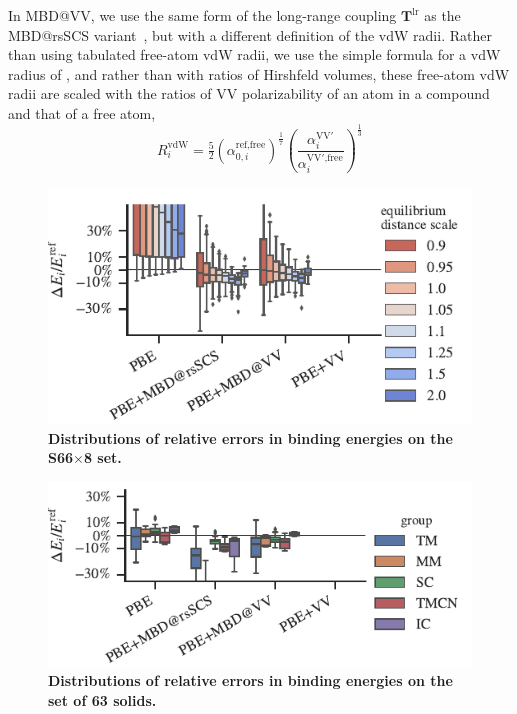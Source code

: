 In MBD@VV, we use the same form of the long-range coupling $\mathbf T^\text{lr}$ as the MBD@rsSCS variant~\citep{AmbrosettiJCP14}, but with a different definition of the vdW radii.
Rather than using tabulated free-atom vdW radii, we use the simple formula for a vdW radius of \citet{FedorovPRL18}, and rather than with ratios of Hirshfeld volumes, these free-atom vdW radii are scaled with the ratios of VV polarizability of an atom in a compound and that of a free atom,\begin{equation}
  R_i^\text{vdW}=\tfrac52{(\alpha_{0,i}^\text{ref,free})}^\frac17{\left(\frac{\alpha_i^\mathrm{VV'}}{\alpha_i^\text{VV$'$,free}}\right)}^\frac13
\end{equation}


\begin{figure}[t!]
\centering
\includegraphics{../media/s66-errors.pdf}
\caption{\textbf{Distributions of relative errors in binding energies on the S66$\times$8 set.}
}\label{fig:s66-errors}
\end{figure}

\begin{figure}[t!]
\centering
\includegraphics{../media/solids-errors.pdf}
\caption{\textbf{Distributions of relative errors in binding energies on the set of 63 solids.}
}\label{fig:solids-errors}
\end{figure}

